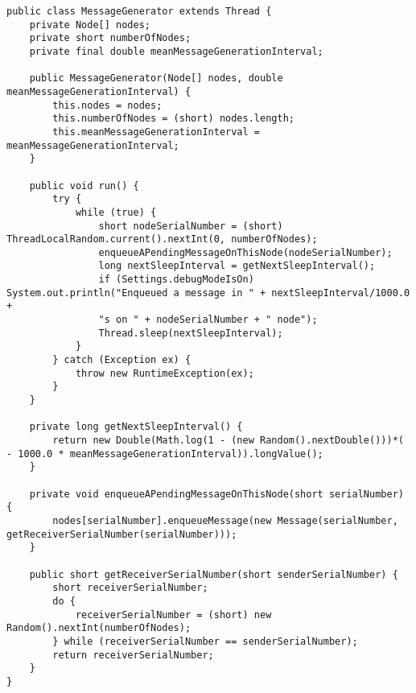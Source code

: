 \begin{lstlisting}
public class MessageGenerator extends Thread {
    private Node[] nodes;
    private short numberOfNodes;
    private final double meanMessageGenerationInterval;

    public MessageGenerator(Node[] nodes, double meanMessageGenerationInterval) {
        this.nodes = nodes;
        this.numberOfNodes = (short) nodes.length;
        this.meanMessageGenerationInterval = meanMessageGenerationInterval;
    }

    public void run() {
        try {
            while (true) {
                short nodeSerialNumber = (short) ThreadLocalRandom.current().nextInt(0, numberOfNodes);
                enqueueAPendingMessageOnThisNode(nodeSerialNumber);
                long nextSleepInterval = getNextSleepInterval();
                if (Settings.debugModeIsOn) System.out.println("Enqueued a message in " + nextSleepInterval/1000.0 +
                "s on " + nodeSerialNumber + " node");
                Thread.sleep(nextSleepInterval);
            }
        } catch (Exception ex) {
            throw new RuntimeException(ex);
        }
    }

    private long getNextSleepInterval() {
        return new Double(Math.log(1 - (new Random().nextDouble()))*( - 1000.0 * meanMessageGenerationInterval)).longValue();
    }

    private void enqueueAPendingMessageOnThisNode(short serialNumber) {
        nodes[serialNumber].enqueueMessage(new Message(serialNumber, getReceiverSerialNumber(serialNumber)));
    }

    public short getReceiverSerialNumber(short senderSerialNumber) {
        short receiverSerialNumber;
        do {
            receiverSerialNumber = (short) new Random().nextInt(numberOfNodes);
        } while (receiverSerialNumber == senderSerialNumber);
        return receiverSerialNumber;
    }
}
\end{lstlisting}
